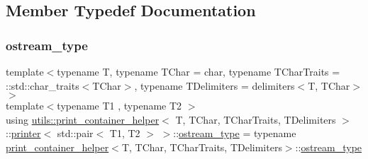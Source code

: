 \subsection{Member Typedef Documentation}
\mbox{\label{structutils_1_1print__container__helper_1_1printer_3_01std_1_1pair_3_01_t1_00_01_t2_01_4_01_4_a170b667e3c3c6f0dae4c03c207517bbd}} 
\subsubsection{\texorpdfstring{ostream\_type}{ostream\_type}}
{\footnotesize\ttfamily template$<$typename T, typename T\+Char = char, typename T\+Char\+Traits = \+::std\+::char\+\_\+traits$<$\+T\+Char$>$, typename T\+Delimiters = delimiters$<$\+T, T\+Char$>$$>$ \\
template$<$typename T1 , typename T2 $>$ \\
using \mbox{\hyperlink{structutils_1_1print__container__helper}{utils\+::print\+\_\+container\+\_\+helper}}$<$ T, T\+Char, T\+Char\+Traits, T\+Delimiters $>$\+::\mbox{\hyperlink{structutils_1_1print__container__helper_1_1printer}{printer}}$<$ std\+::pair$<$ T1, T2 $>$ $>$\+::\mbox{\hyperlink{structutils_1_1print__container__helper_1_1printer_3_01std_1_1pair_3_01_t1_00_01_t2_01_4_01_4_a170b667e3c3c6f0dae4c03c207517bbd}{ostream\+\_\+type}} =  typename \mbox{\hyperlink{structutils_1_1print__container__helper}{print\+\_\+container\+\_\+helper}}$<$T, T\+Char, T\+Char\+Traits, T\+Delimiters$>$\+::\mbox{\hyperlink{structutils_1_1print__container__helper_1_1printer_3_01std_1_1pair_3_01_t1_00_01_t2_01_4_01_4_a170b667e3c3c6f0dae4c03c207517bbd}{ostream\+\_\+type}}}



